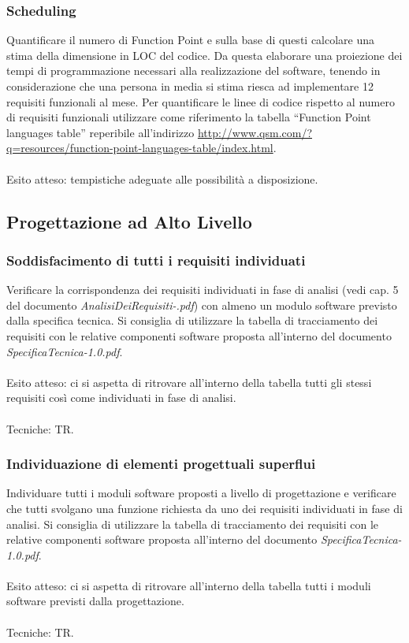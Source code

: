 \subsubsection*{Scheduling}

Quantificare il numero di Function Point e sulla base di questi calcolare una
stima della dimensione in LOC del codice. Da questa elaborare una proiezione dei
tempi di programmazione necessari alla realizzazione del software, tenendo in
considerazione che una persona in media si stima riesca ad implementare 12
requisiti funzionali al mese. Per quantificare le linee di codice
rispetto al numero di requisiti funzionali utilizzare come riferimento la
tabella ``Function Point languages table'' reperibile all'indirizzo
\url{http://www.qsm.com/?q=resources/function-point-languages-table/index.html}.
\\\\
Esito atteso: tempistiche adeguate alle possibilit\`a a disposizione.


\subsection{Progettazione ad Alto Livello}

\subsubsection*{Soddisfacimento di tutti i requisiti individuati}

Verificare la corrispondenza dei requisiti individuati in fase di analisi (vedi
cap. 5 del documento \emph{AnalisiDeiRequisiti-\versioneAR.pdf}) con almeno un modulo
software previsto dalla specifica tecnica. Si consiglia di utilizzare la tabella di tracciamento dei requisiti con le relative componenti
software proposta all'interno del documento \emph{SpecificaTecnica-1.0.pdf}.
\\\\
Esito atteso: ci si aspetta di ritrovare all'interno della tabella tutti gli
stessi requisiti cos\`i come individuati in fase di analisi.
\\\\
Tecniche: TR.
\subsubsection*{Individuazione di elementi progettuali superflui}

Individuare tutti i moduli software proposti a livello di progettazione e
verificare che tutti svolgano una funzione richiesta da uno dei requisiti individuati in fase
di analisi. Si consiglia di utilizzare la tabella di tracciamento dei requisiti
con le relative componenti software proposta all'interno del documento
\emph{SpecificaTecnica-1.0.pdf}.
\\\\
Esito atteso: ci si aspetta di ritrovare all'interno della tabella tutti i
moduli software previsti dalla progettazione.
\\\\
Tecniche: TR.

